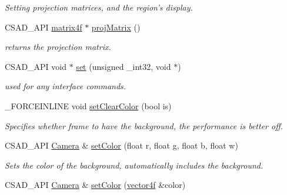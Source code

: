 \begin{DoxyCompactItemize}
\begin{DoxyCompactList}\small\item\em Setting projection matrices, and the region's display. \end{DoxyCompactList}\item 
\hypertarget{classcsad_1_1_camera_a0e4c86b157f37298499a7af6d9ae9cd9}{C\-S\-A\-D\-\_\-\-A\-P\-I \hyperlink{classbt_1_1matrix4f}{matrix4f} $\ast$ \hyperlink{classcsad_1_1_camera_a0e4c86b157f37298499a7af6d9ae9cd9}{proj\-Matrix} ()}\label{classcsad_1_1_camera_a0e4c86b157f37298499a7af6d9ae9cd9}

\begin{DoxyCompactList}\small\item\em returns the projection matrix. \end{DoxyCompactList}\item 
\hypertarget{classcsad_1_1_camera_a0ca732a715c6dac01e00620123327409}{C\-S\-A\-D\-\_\-\-A\-P\-I void $\ast$ \hyperlink{classcsad_1_1_camera_a0ca732a715c6dac01e00620123327409}{set} (unsigned \-\_\-int32, void $\ast$)}\label{classcsad_1_1_camera_a0ca732a715c6dac01e00620123327409}

\begin{DoxyCompactList}\small\item\em used for any interface commands. \end{DoxyCompactList}\item 
\hypertarget{classcsad_1_1_camera_af5c035da21ccd3604305ecf1539a434e}{\-\_\-\-F\-O\-R\-C\-E\-I\-N\-L\-I\-N\-E void \hyperlink{classcsad_1_1_camera_af5c035da21ccd3604305ecf1539a434e}{set\-Clear\-Color} (bool is)}\label{classcsad_1_1_camera_af5c035da21ccd3604305ecf1539a434e}

\begin{DoxyCompactList}\small\item\em Specifies whether frame to have the background, the performance is better off. \end{DoxyCompactList}\item 
\hypertarget{classcsad_1_1_camera_aa8c89f2ac7bfbb0e2f5380bd58fa74b8}{C\-S\-A\-D\-\_\-\-A\-P\-I \hyperlink{classcsad_1_1_camera}{Camera} \& \hyperlink{classcsad_1_1_camera_aa8c89f2ac7bfbb0e2f5380bd58fa74b8}{set\-Color} (float r, float g, float b, float w)}\label{classcsad_1_1_camera_aa8c89f2ac7bfbb0e2f5380bd58fa74b8}

\begin{DoxyCompactList}\small\item\em Sets the color of the background, automatically includes the background. \end{DoxyCompactList}\item 
\hypertarget{classcsad_1_1_camera_a7e212777db0eba5791e9bdc17a9f1e1c}{C\-S\-A\-D\-\_\-\-A\-P\-I \hyperlink{classcsad_1_1_camera}{Camera} \& \hyperlink{classcsad_1_1_camera_a7e212777db0eba5791e9bdc17a9f1e1c}{set\-Color} (\hyperlink{classbt_1_1vector4f}{vector4f} \&color)}\label{classcsad_1_1_camera_a7e212777db0eba5791e9bdc17a9f1e1c}


\end{DoxyCompactItemize}
